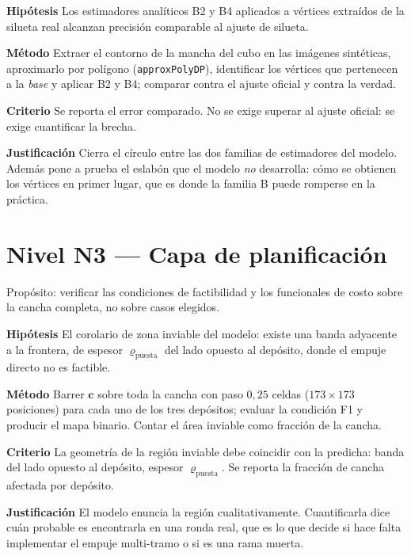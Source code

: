 \documentclass[11pt,a4paper]{article}
\newcommand{\cc}{\mathbf{c}}
\newenvironment{prueba}[2]{%
  \par\medskip\noindent
  \begin{tcolorbox}[enhanced,breakable,colback=white,colframe=black!45,
    boxrule=0.5pt,arc=1pt,left=6pt,right=6pt,top=4pt,bottom=4pt,
    title={\bfseries #1\quad\normalfont #2},
    colbacktitle=black!8,coltitle=black,fonttitle=\bfseries\small]
  \small
}{\end{tcolorbox}\par\medskip}
\newcommand{\campo}[1]{\par\smallskip\noindent\textbf{#1}\quad\ignorespaces}
\begin{document}
\begin{prueba}{N2.5}{Estimadores de la familia B sobre contornos reales}
\campo{Hipótesis} Los estimadores analíticos B2 y B4 aplicados a vértices extraídos de
la silueta real alcanzan precisión comparable al ajuste de silueta.
\campo{Método} Extraer el contorno de la mancha del cubo en las imágenes sintéticas,
aproximarlo por polígono (\texttt{approxPolyDP}), identificar los vértices que
pertenecen a la \emph{base} y aplicar B2 y B4; comparar contra el ajuste oficial y
contra la verdad.
\campo{Criterio} Se reporta el error comparado. No se exige superar al ajuste oficial:
se exige cuantificar la brecha.
\campo{Justificación} Cierra el círculo entre las dos familias de estimadores del
modelo. Además pone a prueba el eslabón que el modelo \emph{no} desarrolla: cómo se
obtienen los vértices en primer lugar, que es donde la familia B puede romperse en la
práctica.
\end{prueba}

\section{Nivel N3 --- Capa de planificación}

Propósito: verificar las condiciones de factibilidad y los funcionales de costo sobre
la cancha completa, no sobre casos elegidos.

\begin{prueba}{N3.1}{Mapa de factibilidad del punto de puesta}
\campo{Hipótesis} El corolario de zona inviable del modelo: existe una banda adyacente
a la frontera, de espesor $\varrho_{\mathrm{puesta}}$ del lado opuesto al depósito,
donde el empuje directo no es factible.
\campo{Método} Barrer $\cc$ sobre toda la cancha con paso $0{,}25$ celdas
($173\times173$ posiciones) para cada uno de los tres depósitos; evaluar la condición
F1 y producir el mapa binario. Contar el área inviable como fracción de la cancha.
\campo{Criterio} La geometría de la región inviable debe coincidir con la predicha:
banda del lado opuesto al depósito, espesor $\varrho_{\mathrm{puesta}}$. Se reporta la
fracción de cancha afectada por depósito.
\campo{Justificación} El modelo enuncia la región cualitativamente. Cuantificarla dice
cuán probable es encontrarla en una ronda real, que es lo que decide si hace falta
implementar el empuje multi-tramo o si es una rama muerta.
\end{prueba}
\end{document}
